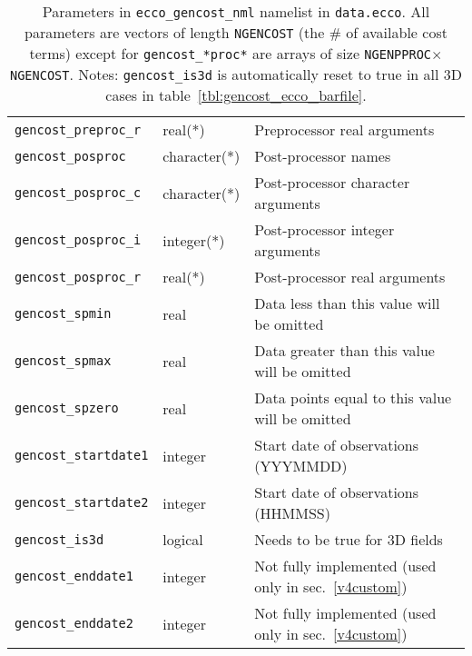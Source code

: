 \begin{table}[!ht]
\begin{tabular}{lll}
\texttt{gencost\_preproc\_r} 	&	real(*)			&	Preprocessor real arguments 	\\
\texttt{gencost\_posproc} 		&	character(*)	&	Post-processor names \\
\texttt{gencost\_posproc\_c} 	&	character(*)	&	Post-processor character arguments 	\\
\texttt{gencost\_posproc\_i} 	&	integer(*) 		&	Post-processor integer arguments 	\\
\texttt{gencost\_posproc\_r} 	&	real(*)			&	Post-processor real arguments 	\\
\hline
\texttt{gencost\_spmin}		&	real			&	Data less than this value will be omitted \\
\texttt{gencost\_spmax}		&	real			&	Data greater than this value will be omitted \\
\texttt{gencost\_spzero}		&	real			&	Data points equal to this value will be omitted \\
\texttt{gencost\_startdate1} 	&	integer			&	Start date of observations (YYYMMDD)	\\
\texttt{gencost\_startdate2} 	&	integer			&	Start date of observations (HHMMSS)				\\
\texttt{gencost\_is3d}			&	logical 		&	Needs to be true for 3D fields \\
\hline
\texttt{gencost\_enddate1} 	&	integer	&	Not fully implemented (used only in sec.~\ref{v4custom})\\
\texttt{gencost\_enddate2} 	&	integer	&	Not fully implemented (used only in sec.~\ref{v4custom})\\
\end{tabular}
\caption{Parameters in \texttt{ecco\_gencost\_nml} namelist in \texttt{data.ecco}. All parameters are vectors of length \texttt{NGENCOST} (the \# of available cost terms) except for \texttt{gencost\_*proc*} are arrays of size \texttt{NGENPPROC}$\times$\texttt{NGENCOST}. Notes: \texttt{gencost\_is3d} is automatically reset to true in all 3D cases in table~\ref{tbl:gencost_ecco_barfile}.}
\label{tbl:gencost_ecco_params}
\end{table}

